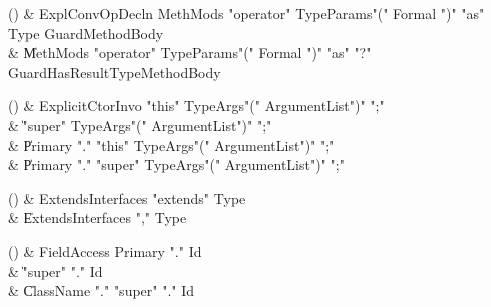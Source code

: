 \begin{bbgrammarappendix}{3.5in}

() & ExplConvOpDecln \label{prod:ExplConvOpDecln}  \: MethMods \xcd"operator" TypeParams\opt \xcd"(" Formal  \xcd")" \xcd"as" Type Guard\opt MethodBody  \\

 &    \| MethMods \xcd"operator" TypeParams\opt \xcd"(" Formal  \xcd")" \xcd"as" \xcd"?" Guard\opt HasResultType\opt MethodBody \\

\end{bbgrammarappendix}

\begin{bbgrammarappendix}{3.4in}

() & ExplicitCtorInvo \label{prod:ExplicitCtorInvo}  \: \xcd"this" TypeArgs\opt \xcd"(" ArgumentList\opt \xcd")" \xcd";"  \\

 &    \| \xcd"super" TypeArgs\opt \xcd"(" ArgumentList\opt \xcd")" \xcd";" \\
 &    \| Primary \xcd"." \xcd"this" TypeArgs\opt \xcd"(" ArgumentList\opt \xcd")" \xcd";" \\
 &    \| Primary \xcd"." \xcd"super" TypeArgs\opt \xcd"(" ArgumentList\opt \xcd")" \xcd";" \\

\end{bbgrammarappendix}

\begin{bbgrammarappendix}{3.3in}

() & ExtendsInterfaces \label{prod:ExtendsInterfaces}  \: \xcd"extends" Type  \\

 &    \| ExtendsInterfaces \xcd"," Type \\

\end{bbgrammarappendix}

\begin{bbgrammarappendix}{3.9in}

() & FieldAccess \label{prod:FieldAccess}  \: Primary \xcd"." Id  \\

 &    \| \xcd"super" \xcd"." Id \\
 &    \| ClassName \xcd"." \xcd"super"  \xcd"." Id \\

\end{bbgrammarappendix}

